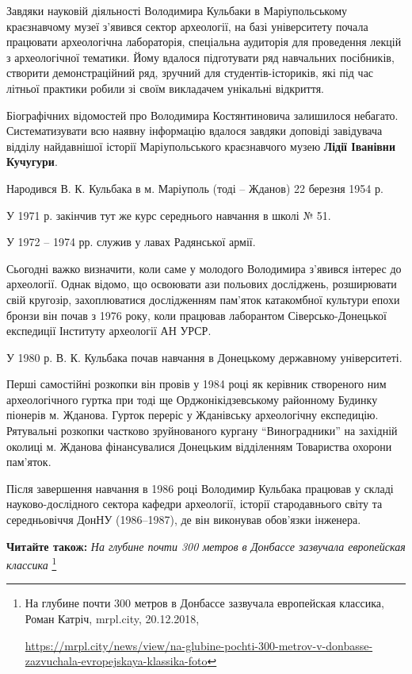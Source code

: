 Завдяки науковій діяльності Володимира Кульбаки в Маріупольському краєзнавчому
музеї з'явився сектор археології, на базі університету почала працювати
археологічна лабораторія, спеціальна аудиторія для проведення лекцій з
археологічної тематики. Йому вдалося підготувати ряд навчальних посібників,
створити демонстраційний ряд, зручний для студентів-істориків, які під час
літньої практики робили зі своїм викладачем унікальні відкриття.

Біографічних відомостей про Володимира Костянтиновича залишилося небагато.
Систематизувати всю наявну інформацію вдалося завдяки доповіді завідувача
відділу найдавнішої історії Маріупольського краєзнавчого музею \textbf{Лідії Іванівни
Кучугури}.

Народився В. К. Кульбака в м. Маріуполь (тоді – Жданов) 22 березня 1954 р.

У 1971 р. закінчив тут же курс середнього навчання в школі № 51.

У 1972 – 1974 рр. служив у лавах Радянської армії.

Сьогодні важко визначити, коли саме у молодого Володимира з'явився інтерес до
археології. Однак відомо, що освоювати ази польових досліджень, розширювати
свій кругозір, захоплюватися дослідженням пам'яток катакомбної культури епохи
бронзи він почав з 1976 року, коли працював лаборантом Сіверсько-Донецької
експедиції Інституту археології АН УРСР.

У 1980 р. В. К. Кульбака почав навчання в Донецькому державному університеті.

Перші самостійні розкопки він провів у 1984 році як керівник створеного ним
археологічного гуртка при тоді ще Орджонікідзевському районному Будинку
піонерів м. Жданова. Гурток переріс у Жданівську археологічну експедицію.
Рятувальні розкопки частково зруйнованого кургану \enquote{Виноградники} на західній
околиці м. Жданова фінансувалися Донецьким відділенням Товариства охорони
пам'яток.

Після завершення навчання в 1986 році Володимир Кульбака працював у складі
науково-дослідного сектора кафедри археології, історії стародавнього світу та
середньовіччя ДонНУ (1986–1987), де він виконував обов'язки інженера.

\textbf{Читайте також:} \emph{На глубине почти 300 метров в Донбассе зазвучала европейская классика}%
\footnote{На глубине почти 300 метров в Донбассе зазвучала европейская классика, Роман Катріч, mrpl.city, 20.12.2018, %
\par\url{https://mrpl.city/news/view/na-glubine-pochti-300-metrov-v-donbasse-zazvuchala-evropejskaya-klassika-foto}
}

